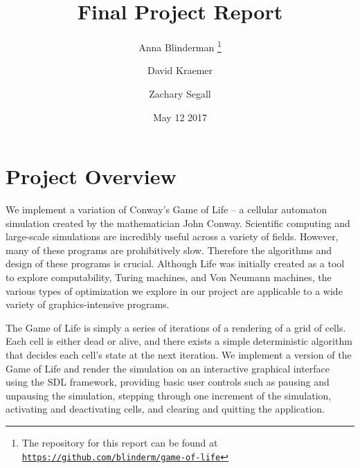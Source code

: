 \documentclass[onecolumn,12pt]{IEEEtran}
\title{Final Project Report}
\author{Anna Blinderman%
    \thanks{The repository for this report can be found at \href{https://github.com/blinderm/game-of-life} {\texttt{https://github.com/blinderm/game-of-life}}}}
\author{David Kraemer}
\author{Zachary Segall}
\affil{CSC 213: Operating Systems and Parallel Algorithms}
\date{May 12 2017}
\begin{document}
\maketitle


\section{Project Overview}

We implement a variation of Conway's Game of Life -- a cellular automaton
simulation created by the mathematician John Conway.  Scientific computing and
large-scale simulations are incredibly useful across a variety of fields.
However, many of these programs are prohibitively slow. Therefore the
algorithms and design of these programs is crucial. Although Life was initially
created as a tool to explore computability, Turing machines, and Von Neumann
machines, the various types of optimization we explore in our project are
applicable to a wide variety of graphics-intensive programs. 
	
The Game of Life is simply a series of iterations of a rendering of a grid of
cells. Each cell is either dead or alive, and there exists a simple
deterministic algorithm that decides each cell's state at the next iteration.
We implement a version of the Game of Life and render the simulation on an
interactive graphical interface using the SDL framework, providing basic user
controls such as pausing and unpausing the simulation, stepping through one
increment of the simulation, activating and deactivating cells, and clearing
and quitting the application.
	
\end{document}
